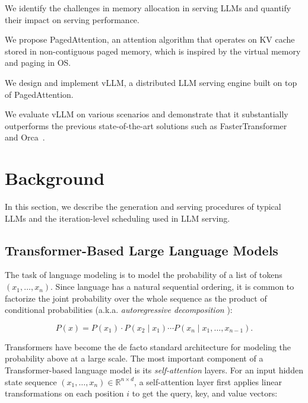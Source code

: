 \begin{CompactItemize}
    \item We identify the challenges in memory allocation in serving LLMs and quantify their impact on serving performance.
    \item We propose PagedAttention, an attention algorithm that operates on KV cache stored in non-contiguous paged memory, which is inspired by the virtual memory and paging in OS.
    \item We design and implement vLLM, a distributed LLM serving engine built on top of PagedAttention.
    \item We evaluate vLLM on various scenarios and demonstrate that it substantially outperforms the previous state-of-the-art solutions such as FasterTransformer~\cite{nvidiaft} and Orca~\cite{yu2022orca}.
\end{CompactItemize}

\section{Background}

In this section, we describe the generation and serving procedures of typical LLMs and the iteration-level scheduling used in LLM serving.

\subsection{Transformer-Based Large Language Models} The task of language modeling is to model the probability of a list of tokens $(x_1, \ldots, x_n).$ Since language has a natural sequential ordering, it is common to factorize the joint probability over the whole sequence as the product of conditional probabilities (a.k.a. \emph{autoregressive decomposition} \cite{bengio2000neural}):

\begin{equation}
P(x) = P(x_1) \cdot P(x_2\mid x_1) \cdots P(x_n \mid x_1, \ldots, x_{n-1}). \label{eq:autoregressive-decomposition}   
\end{equation}

Transformers \cite{vaswani2017attention} have become the de facto standard architecture for modeling the probability above at a large scale. The most important component of a Transformer-based language model is its \emph{self-attention} layers. For an input hidden state sequence $(x_1, \ldots, x_n) \in \mathbb{R}^{n\times d}$, a self-attention layer first applies linear transformations on each position $i$ to get the query, key, and value vectors:

